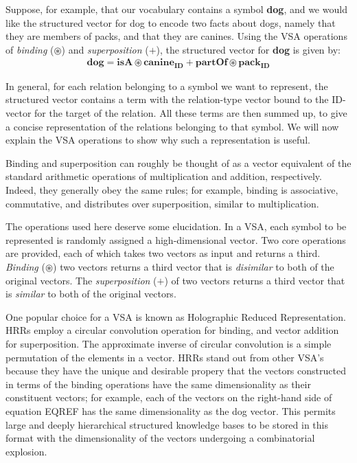 \documentclass[10pt,letterpaper]{article}
\begin{document}
Suppose, for example, that our vocabulary contains a symbol \textbf{dog}, and we would like the structured vector for dog to encode two facts about dogs, namely that they are members of packs, and that they are canines. Using the VSA operations of \textit{binding} ($\circledast$) and \textit{superposition} ($+$), the structured vector for \textbf{dog} is given by:
\begin{align}
  \mathbf{dog} = \mathbf{isA} \circledast \mathbf{canine_{ID}} + \mathbf{partOf} \circledast \mathbf{pack_{ID}}\label{eqn:dog-sem}
\end{align}

In general, for each relation belonging to a symbol we want to represent, the structured vector contains a term with the relation-type vector bound to the ID-vector for the target of the relation. All these terms are then summed up, to give a concise representation of the relations belonging to that symbol. We will now explain the VSA operations to show why such a representation is useful.

Binding and superposition can roughly be thought of as a vector equivalent of the standard arithmetic operations of multiplication and addition, respectively. Indeed, they generally obey the same rules; for example, binding is associative, commutative, and distributes over superposition, similar to multiplication. 


The operations used here deserve some elucidation. In a VSA, each symbol to be represented is randomly assigned a high-dimensional vector. Two core operations are provided, each of which takes two vectors as input and returns a third. \textit{Binding} ($\circledast$) two vectors returns a third vector that is \textit{disimilar} to both of the original vectors. The \textit{superposition} ($+$) of two vectors returns a third vector that is \textit{similar} to both of the original vectors. 

One popular choice for a VSA is known as Holographic Reduced Representation. HRRs employ a circular convolution operation for binding, and vector addition for superposition. The approximate inverse of circular convolution is a simple permutation of the elements in a vector. HRRs stand out from other VSA's because they have the unique and desirable propery that the vectors constructed in terms of the binding operations have the same dimensionality as their constituent vectors; for example, each of the vectors on the right-hand side of equation EQREF has the same dimensionality as the dog vector. This permits large and deeply hierarchical structured knowledge bases to be stored in this format with the dimensionality of the vectors undergoing a combinatorial explosion.
\end{document}
